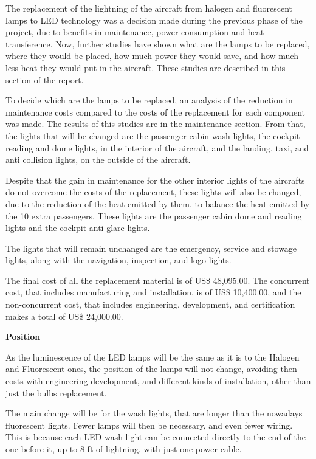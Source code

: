 ﻿%
The replacement of the lightning of the aircraft from halogen and fluorescent lamps to LED technology was a decision made during the previous phase of the project, due to benefits in maintenance, power consumption and heat transference. Now, further studies have shown what are the lamps to be replaced, where they would be placed, how much power they would save, and how much less heat they would put in the aircraft. These studies are described in this section of the report.

To decide which are the lamps to be replaced, an analysis of the reduction in maintenance costs compared to the costs of the replacement for each component was made. The results of this studies are in the maintenance section. From that, the lights that will be changed are the passenger cabin wash lights, the cockpit reading and dome lights, in the interior of the aircraft, and the landing, taxi, and anti collision lights, on the outside of the aircraft.

Despite that the gain in maintenance for the other interior lights of the aircrafts do not overcome the costs of the replacement, these lights will also be changed, due to the reduction of the heat emitted by them, to balance the heat emitted by the 10 extra passengers. These lights are the passenger cabin dome and reading lights and the cockpit anti-glare lights.

The lights that will remain unchanged are the emergency, service and stowage lights, along with the navigation, inspection, and logo lights.

The final cost of all the replacement material is of US\$ 48,095.00. The concurrent cost, that includes manufacturing and installation, is of US\$ 10,400.00, and the non-concurrent cost, that includes engineering, development, and certification makes a total of US\$ 24,000.00.

\textbf{Position}

As the luminescence of the LED lamps will be the same as it is to the Halogen and Fluorescent ones, the position of the lamps will not change, avoiding then costs with engineering development, and different kinds of installation, other than just the bulbs replacement.

The main change will be for the wash lights, that are longer than the nowadays fluorescent lights. Fewer lamps will then be necessary, and even fewer wiring. This is because each LED wash light can be connected directly to the end of the one before it, up to 8 ft of lightning, with just one power cable.

